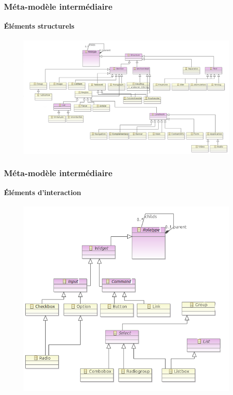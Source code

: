 \documentclass[]{beamer}
\begin{document}
\begin{frame}
\frametitle{Méta-modèle intermédiaire}
\framesubtitle{Éléments structurels}
\begin{figure}
\centering
\includegraphics[scale=0.335]{img/metamodele_structure.png}
\end{figure}
\end{frame}

\begin{frame}
\frametitle{Méta-modèle intermédiaire}
\framesubtitle{Éléments d'interaction}
\begin{figure}
\centering
\includegraphics[scale=0.4]{img/metamodele_widget.png}
\end{figure}
\end{frame}
\end{document}
